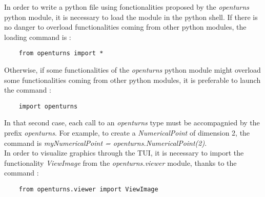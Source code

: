 \renewcommand{\filename}{docUC_Intro_PythonLib}
\renewcommand{\filetitle}{Loading the openturns python library}

\HeaderNNIILevel



In order to write a python file using fonctionalities proposed by the \emph{openturns} python module, it is necessary to load the module in the python shell. If there is no danger to overload functionalities coming from other python modules, the loading command is :


\begin{center}
  \begin{lstlisting}
    from openturns import *
  \end{lstlisting}
\end{center}
Otherwise, if some functionalities of the {\itshape openturns} python module might overload some functionalities coming from other python modules, it is preferable to launch the command :
\begin{center}
  \begin{lstlisting}
    import openturns
  \end{lstlisting}
\end{center}
In that second case, each call to an {\itshape openturns} type must be accompagnied by the prefix {\itshape openturns}. For example, to create a {\itshape NumericalPoint} of dimension 2, the command is {\itshape myNumericalPoint = openturns.NumericalPoint(2)}.\\

In order to visualize graphics through the TUI, it is necessary to import the functionality {\itshape ViewImage} from the  {\itshape openturns.viewer} module, thanks to the command :
\begin{center}
  \begin{lstlisting}
    from openturns.viewer import ViewImage
  \end{lstlisting}
\end{center}

